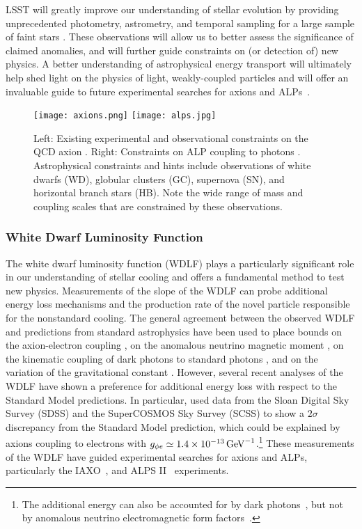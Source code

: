 LSST will greatly improve our understanding of stellar evolution by providing unprecedented photometry, astrometry, and temporal sampling for a large sample of faint stars \citep{0912.0201}.
These observations will allow us to better assess the significance of claimed anomalies, and will further guide constraints on (or detection of) new physics.
A better understanding of astrophysical energy transport will ultimately help shed light on the physics of light, weakly-coupled particles and will offer an invaluable guide to future experimental searches for axions and ALPs~\citep{Irastorza:2018dyq}.

\begin{figure}[t]
\centering
\texttt{[image: axions.png]}
\texttt{[image: alps.jpg]}
\caption{Left: Existing experimental and observational constraints on the QCD axion \citep{Redino:2015}.  
Right: Constraints on ALP coupling to photons \citep{Ringwald:2012}.
Astrophysical constraints and hints include observations of white dwarfs (WD), globular clusters (GC), supernova (SN), and horizontal branch stars (HB).
Note the wide range of mass and coupling scales that are constrained by these observations.
\label{fig:axions}
}
\end{figure}

\subsubsection{White Dwarf Luminosity Function}

The white dwarf luminosity function (WDLF) plays a particularly significant role in our understanding of stellar cooling and offers a fundamental method to test new physics.
Measurements of the slope of the WDLF can probe additional energy loss mechanisms and the production rate of the novel particle responsible for the nonstandard cooling.
The general agreement between the observed WDLF and predictions from standard astrophysics have been used to place bounds on the axion-electron coupling \citep{Isern:2008nt,Bertolami:2014wua}, on the anomalous neutrino magnetic moment \citep{Bertolami:2014noa}, on the kinematic coupling of dark photons to standard photons \citep{Chang:2016qfl}, and on the variation of the gravitational constant \citep{Althaus:2011ca}.
However, several recent analyses of the WDLF have shown a preference for additional energy loss with respect to the Standard Model predictions.
In particular, \cite{Bertolami:2014wua} used data from the Sloan Digital Sky Survey (SDSS) and the SuperCOSMOS Sky Survey (SCSS) to show a $2 \sigma$ discrepancy from the Standard Model prediction, which could be explained by axions coupling to electrons with $g_{\phi e}\simeq 1.4\times 10^{-13} \mathrm{\,GeV}^{-1}$.\footnote{The additional energy can also be accounted for by dark photons~\citep{Giannotti:2015kwo,Chang:2016qfl}, but not by anomalous neutrino electromagnetic form factors~\citep{Bertolami:2014noa}.}
These measurements of the WDLF have guided experimental searches for axions and ALPs, particularly the IAXO~\citep{Irastorza:2011gs,Armengaud:2014gea}, and ALPS II~\citep{Bahre:2013ywa,ALPSII} experiments.

